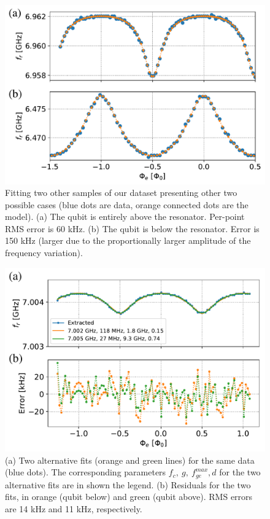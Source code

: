 \documentclass[%
 aip,
 amsmath,amssymb,
 reprint,%
]{revtex4-1}
\begin{document}
\begin{figure}
	\centering
	\includegraphics[width=\linewidth]{fit_other_cases}
	\caption{Fitting two other samples of our dataset presenting other two possible cases (blue dots are data, orange connected dots are the model). (a) The qubit is entirely above the resonator. Per-point RMS error is 60 kHz. (b) The qubit is below the resonator. Error is 150 kHz (larger due to the proportionally larger amplitude of the frequency variation).}
	\label{fit-other-cases}
\end{figure}

\begin{figure}
	\centering
	\includegraphics[width=\linewidth]{alternative_fits}
	\caption{(a) Two alternative fits (orange and green lines) for the same data (blue dots). The corresponding parameters $f_c,\ g,\ f_{ge}^{max}, d$ for the two alternative fits are in shown the legend. (b) Residuals for the two fits, in orange (qubit below) and green (qubit above). RMS errors are 14 kHz and 11 kHz, respectively.}
	\label{fig:alternative-fits}
\end{figure}
\end{document}
